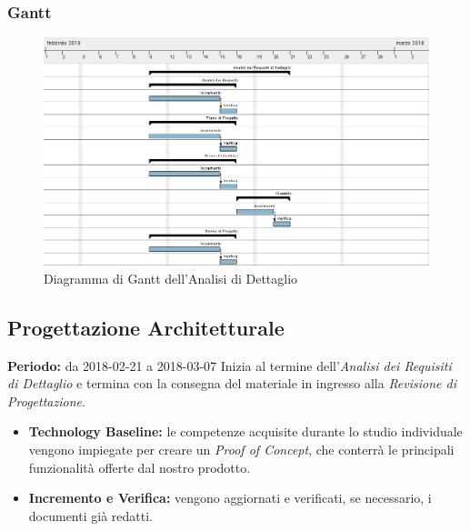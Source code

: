 \subsubsection{Gantt}
\begin{figure}[H]
	\centering 
	\includegraphics[width=1\textwidth]{images/Analisi-Dettaglio.png}
	\caption{Diagramma di Gantt dell'Analisi di Dettaglio}
	\label{graficobello2} 
\end{figure}
\subsection{Progettazione Architetturale}
    \textbf{Periodo:} da 2018-02-21 a 2018-03-07 \Spazio
    Inizia al termine dell'\emph{Analisi dei Requisiti di Dettaglio} e termina con la consegna del materiale in ingresso alla \emph{Revisione di Progettazione}.
    \begin{itemize}
    	\item \textbf{Technology Baseline:} le competenze acquisite durante lo studio individuale vengono impiegate per creare un \textit{Proof of Concept}, che conterrà le principali funzionalità offerte dal nostro prodotto.
    	\item \textbf{Incremento e Verifica:} vengono aggiornati e verificati, se necessario, i documenti già redatti.	
    \end{itemize}
